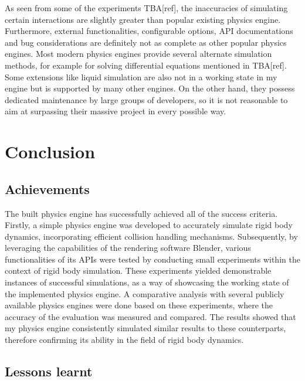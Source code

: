 \documentclass[12pt,a4paper,twoside,openright]{report}
\begin{document}
\begin{itemize}
As seen from some of the experiments TBA[ref], the inaccuracies of simulating certain interactions are slightly greater than popular existing physics engine. Furthermore, external functionalities, configurable options, API documentations and bug considerations are definitely not as complete as other popular physics engines. Most modern physics engines provide several alternate simulation methods, for example for solving differential equations mentioned in TBA[ref]. Some extensions like liquid simulation are also not in a working state in my engine but is supported by many other engines. On the other hand, they possess dedicated maintenance by large groups of developers, so it is not reasonable to aim at surpassing their massive project in every possible way.

\end{itemize}

\chapter{Conclusion}\label{chap5}

\section{Achievements}

The built physics engine has successfully achieved all of the success criteria. Firstly, a simple physics engine was developed to accurately simulate rigid body dynamics, incorporating efficient collision handling mechanisms. Subsequently, by leveraging the capabilities of the rendering software Blender, various functionalities of its APIs were tested by conducting small experiments within the context of rigid body simulation. These experiments yielded demonstrable instances of successful simulations, as a way of showcasing the working state of the implemented physics engine. A comparative analysis with several publicly available physics engines were done based on these experiments, where the accuracy of the evaluation was measured and compared. The results showed that my physics engine consistently simulated similar results to these counterparts, therefore confirming its ability in the field of rigid body dynamics.

\section{Lessons learnt}
\end{document}
